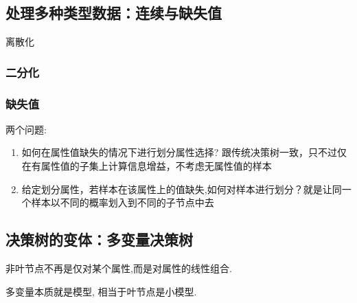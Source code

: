 \subsection{处理多种类型数据：连续与缺失值}
离散化

\subsubsection{二分化}

\subsubsection{缺失值}
两个问题:
\begin{enumerate}\small
    \item 如何在属性值缺失的情况下进行划分属性选择? 跟传统决策树一致，只不过仅在有属性值的子集上计算信息增益，不考虑无属性值的样本
    \item 给定划分属性，若样本在该属性上的值缺失,如何对样本进行划分？就是让同一个样本以不同的概率划入到不同的子节点中去
\end{enumerate}

\subsection{决策树的变体：多变量决策树}
非叶节点不再是仅对某个属性,而是对属性的线性组合. 

多变量本质就是模型, 相当于叶节点是小模型. 